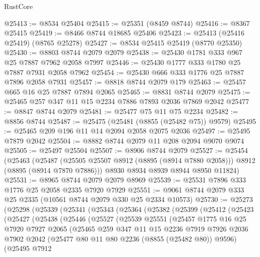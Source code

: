 \begin{lexlean}{RustCore}
\begin{coremodule}
@25413 := @8534 @25404
@25415 := @25351 (@8459 @8744)
@25416 := @8367 @25415
@25419 := @8466 @8744 @18685 @25406
@25423 := @25413 (@25416 @25419) (@8765 @25278)
@25427 := @8534 @25415 @25419 (@8770 @25350)
@25430 := @8803 @8744 @2079 @2079
@25438 := @25430 @1781 @333 @967 @25 @7887 @7962 @2058 @7997
@25446 := @25430 @1777 @333 @1780 @25 @7887 @7931 @2058 @7962
@25454 := @25430 @666 @333 @1776 @25 @7887 @7896 @2058 @7931
@25457 := @8818 @8744 @2079 @179
@25463 := @25457 @665 @16 @25 @7887 @7894 @2065
@25465 := @8831 @8744 @2079
@25475 := @25465 @257 @347 @11 @15 @2234 @7886 @7893 @2036 @7869 @2042
@25477 := @8847 @8744 @2079
@25481 := @25477 @75 @11 @75 @2234
@25482 := @8856 @8744
@25487 := @25475 (@25481 (@8855 (@25482 @75)) @9579)
@25495 := @25465 @209 @196 @11 @14 @2094 @2058 @2075 @2036
@25497 := @25495 @7879 @2042
@25504 := @8882 @8744 @2079 @11 @208 @2094 @9070 @9074
@25505 := @25497 @25504
@25507 := @8906 @8744 @2079
@25527 := @25454
    (@25463
      (@25487 (@25505 @25507 @8912 (@8895 (@8914 @7880 @2058))) @8912 (@8895 (@8914 @7870 @7886)))
      @8930
      @8934
      @8939
      @8944
      @8950
      @11824)
@25531 := @8965 @8744 @2079 @2079 @8969
@25539 := @25531 @7896 @333 @1776 @25 @2058 @2335 @7920 @7929
@25551 := @9061 @8744 @2079 @333 @25 @2335 (@10561 @8744 @2079 @330 @25 @2334 @10573)
@25730 := @25273
    (@25298
      (@25339
        (@25341
          (@25343
            (@25364
              (@25382
                (@25399
                  (@25412
                    (@25423
                      (@25427
                        (@25438
                          (@25446
                            (@25527
                              (@25539
                                @25551
                                (@25457
                                  @1775
                                  @16
                                  @25
                                  @7920
                                  @7927
                                  @2065
                                  (@25465
                                    @259
                                    @347
                                    @11
                                    @15
                                    @2236
                                    @7919
                                    @7926
                                    @2036
                                    @7902
                                    @2042
                                    (@25477 @80 @11 @80 @2236 (@8855 (@25482 @80)) @9596)
                                    (@25495
                                      @7912

\end{coremodule}
\end{lexlean}
